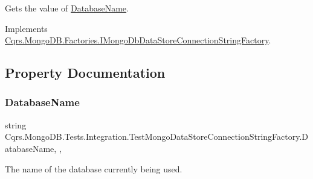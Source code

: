 Gets the value of \hyperlink{classCqrs_1_1MongoDB_1_1Tests_1_1Integration_1_1TestMongoDataStoreConnectionStringFactory_a2d26a00fd14aad6718b48d515ac30ff9_a2d26a00fd14aad6718b48d515ac30ff9}{Database\+Name}. 



Implements \hyperlink{interfaceCqrs_1_1MongoDB_1_1Factories_1_1IMongoDbDataStoreConnectionStringFactory_aca9921fae4214a9eb22a221825c57363_aca9921fae4214a9eb22a221825c57363}{Cqrs.\+Mongo\+D\+B.\+Factories.\+I\+Mongo\+Db\+Data\+Store\+Connection\+String\+Factory}.



\subsection{Property Documentation}
\mbox{\label{classCqrs_1_1MongoDB_1_1Tests_1_1Integration_1_1TestMongoDataStoreConnectionStringFactory_a2d26a00fd14aad6718b48d515ac30ff9_a2d26a00fd14aad6718b48d515ac30ff9}} 
\subsubsection{\texorpdfstring{Database\+Name}{DatabaseName}}
{\footnotesize\ttfamily string Cqrs.\+Mongo\+D\+B.\+Tests.\+Integration.\+Test\+Mongo\+Data\+Store\+Connection\+String\+Factory.\+Database\+Name\hspace{0.3cm}{\ttfamily [static]}, {\ttfamily [get]}, {\ttfamily [set]}}



The name of the database currently being used. 

